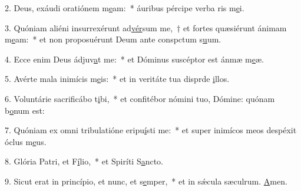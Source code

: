 2. Deus, exáudi oratiónem m\uline{e}am:~* áuribus pércipe verba ris m\uline{e}i.\par 
3. Quóniam aliéni insurrexérunt ad\uline{vér}sum me,~† et fortes quæsiérunt ánimam m\uline{e}am:~* et non proposuérunt Deum ante conspctum s\uline{u}um.\par 
4. Ecce enim Deus ádjuv\uline{a}t me:~* et Dóminus suscéptor est ánmæ m\uline{e}æ.\par 
5. Avérte mala inimícis m\uline{e}is:~* et in veritáte tua disprde \uline{i}llos.\par 
6. Voluntárie sacrificábo t\uline{i}bi,~* et confitébor nómini tuo, Dómine: quónam b\uline{o}num est:\par 
7. Quóniam ex omni tribulatióne eripu\uline{í}sti me:~* et super inimícos meos despéxit óclus m\uline{e}us.\par 
8. Glória Patri, et F\uline{í}lio,~* et Spiríti S\uline{a}ncto.\par 
9. Sicut erat in princípio, et nunc, et s\uline{e}mper,~* et in sǽcula sæculrum. \uline{A}men.\par 
